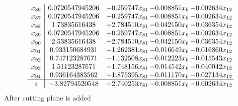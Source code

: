 \documentclass[11pt]{article}
\begin{document}
\[\begin{array}{c| c c@{\hskip 2pt} c@{\hskip 2pt} c@{\hskip 2pt} }
 x_{86}   &  0.0720547945206 & + 0.259747 x_{81} & -0.008851 x_{6} & -0.002634 x_{12}\\
 x_{87}   &  0.0720547945206 & + 0.259747 x_{81} & -0.008851 x_{6} & -0.002634 x_{12}\\
 x_{88}   &  1.73835616438 & + 2.784510 x_{81} & -0.042150 x_{6} & -0.036354 x_{12}\\
 x_{89}   &  0.0720547945206 & + 0.259747 x_{81} & -0.008851 x_{6} & -0.002634 x_{12}\\
 x_{90}   &  2.53835616438 & + 2.784510 x_{81} & -0.042150 x_{6} & -0.036354 x_{12}\\
 x_{91}   &  0.933150684931 & + 1.262381 x_{81} & -0.016649 x_{6} & -0.016860 x_{12}\\
 x_{92}   &  0.747123287671 & + 1.132508 x_{81} & -0.012223 x_{6} & -0.015543 x_{12}\\
 x_{93}   &  1.51123287671 & + 1.748156 x_{81} & -0.014542 x_{6} & -0.040042 x_{12}\\
 x_{94}   &  0.936164383562 & + 1.875395 x_{81} & -0.011170 x_{6} & -0.027134 x_{12}\\
\hline
z    &  -3.82794520548 & -2.740253 x_{81} & -0.008851 x_{6} & -0.002634 x_{12}\\
\end{array}\]
 After cutting plane is added 
\end{document}
